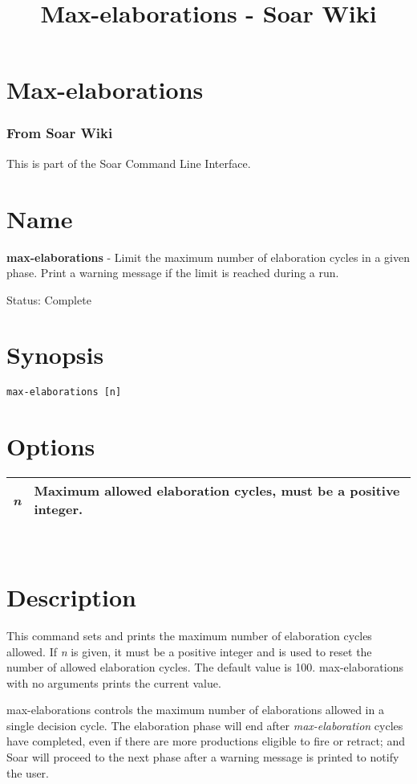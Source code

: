 \documentclass[10pt]{article}
\title{Max-elaborations - Soar Wiki}
\begin{document}
\section*{Max-elaborations}
\subsubsection*{From Soar Wiki}


 This is part of the Soar Command Line Interface. 
\section*{ Name }


 \textbf{max-elaborations}
 - Limit the maximum number of elaboration cycles in a given phase. Print a warning message if the limit is reached during a run. 


 Status: Complete
\section*{ Synopsis }
\begin{verbatim}
max-elaborations [n]

\end{verbatim}
\section*{ Options }


\begin{tabular}{|p{1in}|p{5in}|}
\hline 
\emph{n}
 & Maximum allowed elaboration cycles, must be a positive integer.  \\
 \hline 

\end{tabular}



 \\ 

\section*{ Description }


 This command sets and prints the maximum number of elaboration cycles allowed. If \emph{n}
 is given, it must be a positive integer and is used to reset the number of allowed elaboration cycles. The default value is 100. max-elaborations with no arguments prints the current value. 


 max-elaborations controls the maximum number of elaborations allowed in a single decision cycle. The elaboration phase will end after \emph{max-elaboration}
 cycles have completed, even if there are more productions eligible to fire or retract; and Soar will proceed to the next phase after a warning message is printed to notify the user. 
\end{document}
